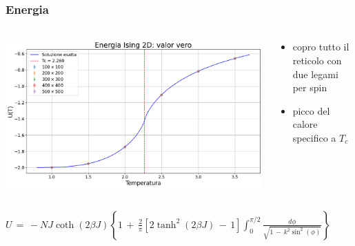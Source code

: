 \begin{frame}
    \frametitle{Energia}
    \framesubtitle{}

    \begin{columns}
        \begin{column}{0.6\textwidth}

            \centering
            \includegraphics[width=\textwidth]{Immagini/simIsing2D/ene.png}

        \end{column}
    
        \begin{column}{0.4\textwidth}


                \begin{itemize}[itemsep=0.5em, label=$\diamond$]
                    \item copro tutto il reticolo con due legami per spin
                    \item picco del calore specifico a $T_c$
                \end{itemize}
            
        \end{column}
    \end{columns}

    \vspace{0.5cm}
    \centering
    $U\,=\,-NJ\coth{\left(2\beta J\right)}\left\{1\,+\,\frac{2}{\pi}\left[2\tanh^2\left(2\beta J\right)\,-\,1\right]\int_0^{\pi/2}\frac{d\phi}{\sqrt{1\,-\,k^2\sin^2{\left(\phi\right)}}}\right\}$

\end{frame}



